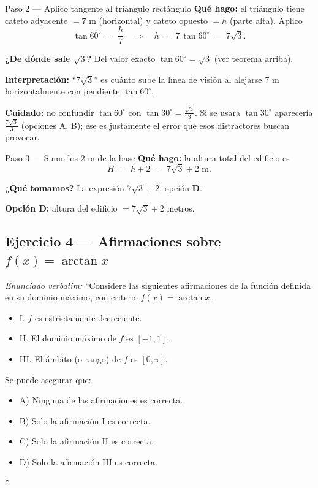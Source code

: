 \documentclass[11pt]{article}
\begin{document}
\begin{paso}{Paso 2 --- Aplico tangente al triángulo rectángulo}
\textbf{Qué hago:} el triángulo tiene cateto adyacente $=7$ m (horizontal) y cateto opuesto $=h$ (parte alta). Aplico
\[
\tan 60^\circ \;=\; \dfrac{h}{7} \quad\Longrightarrow\quad h \;=\; 7\,\tan 60^\circ \;=\; 7\sqrt{3}.
\]

\textbf{¿De dónde sale $\sqrt{3}$?} Del valor exacto $\tan 60^\circ=\sqrt{3}$ (ver teorema arriba).

\textbf{Interpretación:} ``$7\sqrt{3}$'' es cuánto sube la línea de visión al alejarse $7$ m horizontalmente con pendiente $\tan 60^\circ$.

\textbf{Cuidado:} no confundir $\tan 60^\circ$ con $\tan 30^\circ=\tfrac{\sqrt{3}}{3}$. Si se usara $\tan 30^\circ$ aparecería $\tfrac{7\sqrt{3}}{3}$ (opciones A, B); ése es justamente el error que esos distractores buscan provocar.
\end{paso}

\begin{paso}{Paso 3 --- Sumo los $2$ m de la base}
\textbf{Qué hago:} la altura total del edificio es
\[
H \;=\; h + 2 \;=\; 7\sqrt{3} + 2 \text{ m}.
\]

\textbf{¿Qué tomamos?} La expresión $7\sqrt{3}+2$, opción \textbf{D}.
\end{paso}

\begin{resp}
\textbf{Opción D:} altura del edificio $= 7\sqrt{3}+2$ metros.
\end{resp}

\subsection*{Ejercicio 4 --- Afirmaciones sobre $f(x)=\arctan x$}

\textit{Enunciado verbatim:} ``Considere las siguientes afirmaciones de la función definida en su dominio máximo, con criterio $f(x)=\arctan x$.
\begin{itemize}[label={},leftmargin=2em,topsep=2pt,itemsep=0pt]
  \item I. $f$ es estrictamente decreciente.
  \item II. El dominio máximo de $f$ es $[-1,1]$.
  \item III. El ámbito (o rango) de $f$ es $[0,\pi]$.
\end{itemize}
Se puede asegurar que:
\begin{itemize}[label={},leftmargin=2em,topsep=2pt,itemsep=0pt]
  \item A) Ninguna de las afirmaciones es correcta.
  \item B) Solo la afirmación I es correcta.
  \item C) Solo la afirmación II es correcta.
  \item D) Solo la afirmación III es correcta.
\end{itemize}''
\end{document}
